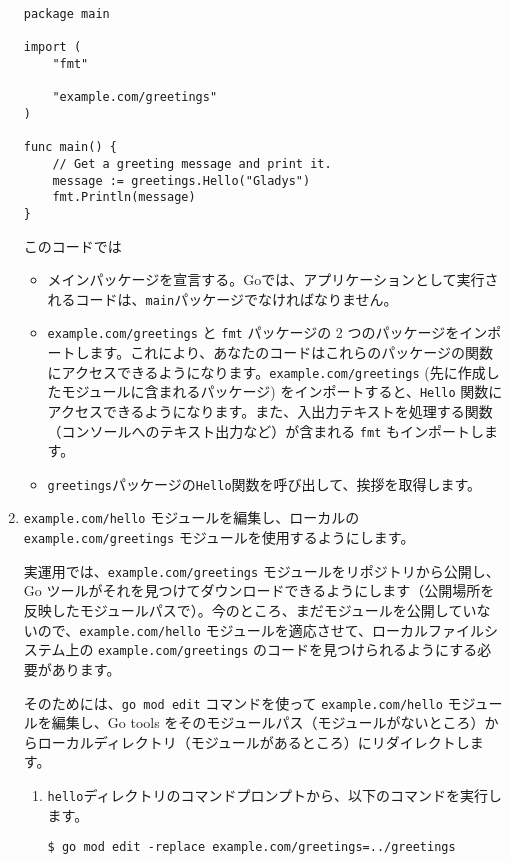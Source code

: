 \begin{enumerate}
\begin{lstlisting}[numbers=none]
package main

import (
    "fmt"

    "example.com/greetings"
)

func main() {
    // Get a greeting message and print it.
    message := greetings.Hello("Gladys")
    fmt.Println(message)
}
\end{lstlisting}


このコードでは

\begin{itemize}
\item メインパッケージを宣言する。Goでは、アプリケーションとして実行されるコードは、\texttt{main}パッケージでなければなりません。
\item \texttt{example.com/greetings} と \texttt{fmt} パッケージの 2 つのパッケージをインポートします。これにより、あなたのコードはこれらのパッケージの関数にアクセスできるようになります。\texttt{example.com/greetings} (先に作成したモジュールに含まれるパッケージ) をインポートすると、\texttt{Hello} 関数にアクセスできるようになります。また、入出力テキストを処理する関数（コンソールへのテキスト出力など）が含まれる \texttt{fmt} もインポートします。
\item \texttt{greetings}パッケージの\texttt{Hello}関数を呼び出して、挨拶を取得します。
\end{itemize}

\item \texttt{example.com/hello} モジュールを編集し、ローカルの \texttt{example.com/greetings} モジュールを使用するようにします。

実運用では、\texttt{example.com/greetings} モジュールをリポジトリから公開し、Go ツールがそれを見つけてダウンロードできるようにします（公開場所を反映したモジュールパスで）。今のところ、まだモジュールを公開していないので、\texttt{example.com/hello} モジュールを適応させて、ローカルファイルシステム上の \texttt{example.com/greetings} のコードを見つけられるようにする必要があります。

そのためには、\texttt{go mod edit} コマンドを使って \texttt{example.com/hello} モジュールを編集し、Go tools をそのモジュールパス（モジュールがないところ）からローカルディレクトリ（モジュールがあるところ）にリダイレクトします。


\begin{enumerate}
\item \texttt{hello}ディレクトリのコマンドプロンプトから、以下のコマンドを実行します。
\begin{lstlisting}[numbers=none]
$ go mod edit -replace example.com/greetings=../greetings
\end{lstlisting}


\end{enumerate}
\end{enumerate}
